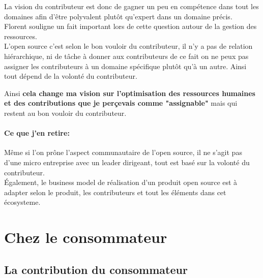 			La vision du contributeur est donc de gagner un peu en compétence dans tout les domaines afin d'être polyvalent plutôt qu'expert dans un domaine précis.\\

			Florent  souligne un fait important lors de cette question autour de la gestion des ressources.\\

			L'open source c'est selon le bon vouloir du contributeur, il n'y a pas de relation hiérarchique, ni de tâche à donner aux contributeurs de ce fait on ne peux pas assigner les contributeurs à un domaine spécifique plutôt qu'à un autre. Ainsi tout dépend de la volonté du contributeur.

			\begin{center}
				\textit{
				}
			\end{center}

			Ainsi \textbf{cela change ma vision sur l'optimisation des ressources humaines et des contributions que je perçevais comme "assignable"} mais qui restent au bon vouloir du contributeur.

		\paragraph{Ce que j'en retire:\\}

			Même si l'on prône l'aspect communautaire de l'open source, il ne s'agit pas d'une micro entreprise avec un leader dirigeant, tout est basé sur la volonté du contributeur.\\ Également, le business model de réalisation d'un produit open source est à adapter selon le produit, les contributeurs et tout les éléments dans cet écosysteme.

	\section{Chez le consommateur}

		\subsection{La contribution du consommateur}

